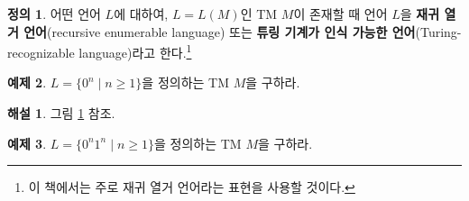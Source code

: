\documentclass[b5paper, 11pt]{book}
\theoremstyle{definition}
\newtheorem{defn}{정의}[chapter]
\newtheorem{ex}[defn]{예제}
\newtheorem*{ans*}{해설}
\begin{document}
\begin{defn}
    어떤 언어 $L$에 대하여, $L = L(M)$인 TM $M$이 존재할 때 언어 $L$을 \textbf{재귀 열거 언어}(recursive enumerable language) 또는 \textbf{튜링 기계가 인식 가능한 언어}(Turing-recognizable language)라고 한다.\footnote{이 책에서는 주로 재귀 열거 언어라는 표현을 사용할 것이다.}
\end{defn}
\begin{ex}\label{tm ex1} 
    $L = \{0^n \;\vert\; n \ge 1\}$을 정의하는 TM $M$을 구하라.
\end{ex}
\begin{ans*}
    그림 \ref{0n TM} 참조.
    \begin{figure}[!ht]
        \centering
        \caption{} 
        \label{0n TM}
    \end{figure}
\end{ans*}
\begin{ex}
    $L = \{0^n1^n \;\vert\; n \ge 1\}$을 정의하는 TM $M$을 구하라.
\end{ex}
\end{document}
